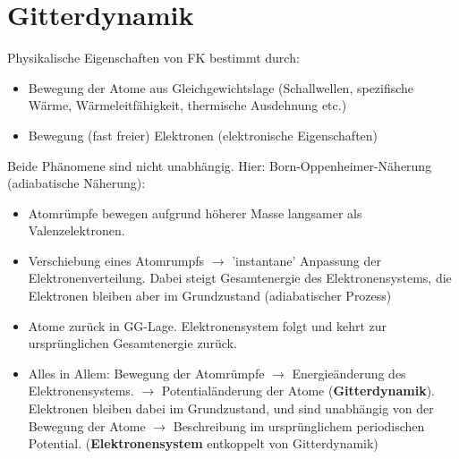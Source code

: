 \section{Gitterdynamik} \label{kap:4}
Physikalische Eigenschaften von FK bestimmt durch:
\begin{itemize}
	\item Bewegung der Atome aus Gleichgewichtslage
	(Schallwellen, spezifische Wärme, Wärmeleitfähigkeit, thermische Ausdehnung etc.)
	\item Bewegung (fast freier) Elektronen (elektronische Eigenschaften)
\end{itemize}
Beide Phänomene sind nicht unabhängig. Hier: Born-Oppenheimer-Näherung (adiabatische Näherung):
\begin{itemize}
	\item Atomrümpfe bewegen aufgrund höherer Masse langsamer als Valenzelektronen.
	\item Verschiebung eines Atomrumpfs $\rightarrow$ 'instantane' Anpassung der Elektronenverteilung.
	Dabei steigt Gesamtenergie des Elektronensystems, die Elektronen bleiben aber im Grundzustand (adiabatischer Prozess)
	\item Atome zurück in GG-Lage. Elektronensystem folgt und kehrt zur ursprünglichen Gesamtenergie zurück.
	\item Alles in Allem: Bewegung der Atomrümpfe $\rightarrow$ Energieänderung des Elektronensystems. 
	$\rightarrow$ Potentialänderung der Atome (\textbf{Gitterdynamik}).
	Elektronen bleiben dabei im Grundzustand, und sind unabhängig von der Bewegung der Atome $\rightarrow$ Beschreibung im
	ursprünglichem periodischen Potential. (\textbf{Elektronensystem} entkoppelt von Gitterdynamik)
\end{itemize}


